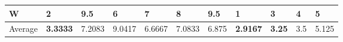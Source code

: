 \documentclass[11pt, a4paper]{article}
\begin{document}
\begin{table}[H]
\begin{tabular}{lllllllllll}
W                             & 2                                        & 9.5                              & 6                                & 7                                  & 8                                 & 9.5                             & 1                                 & 3                                   & 4                                   & 5                                   \\ \hline
Average                               & \textbf{3.3333}                          & 7.2083                           & 9.0417                           & 6.6667                             & 7.0833                            & 6.875                           & \textbf{2.9167}                   & \textbf{3.25}                       & 3.5                                 & 5.125
\end{tabular}
\end{table}
\end{document}
